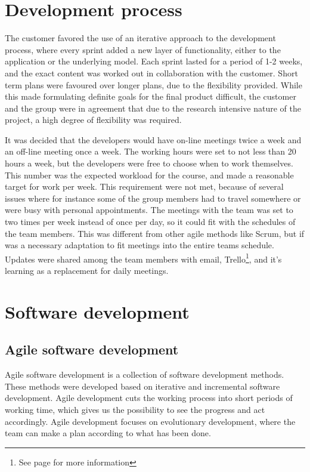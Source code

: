 \section{Development process}
\label{def:devProcess}

The customer favored the use of an iterative approach to the development process, where every sprint added a new layer of functionality, either to the application or the underlying model. Each sprint lasted for a period of 1-2 weeks, and the exact content was worked out in collaboration with the customer. Short term plans were favoured over longer plans, due to the flexibility provided. While this made formulating definite goals for the final product difficult, the customer and the group were in agreement that due to the research intensive nature of the project, a high degree of flexibility was required. 

It was decided that the developers would have on-line meetings twice a week and an off-line meeting once a week. 
The working hours were set to not less than 20 hours a week, but the developers were free to choose when to work themselves. This number was the expected workload for the course, and made a reasonable target for work per week. This requirement were not met, because of several issues where for instance some of the group members had to travel somewhere or were busy with personal appointments. The meetings with the team was set to two times per week instead of once per day, so it could fit with the schedules of the team members. This was different from other agile methods like Scrum, but if was a necessary adaptation to fit meetings into the entire teams schedule. Updates were shared among the team members with email, Trello\footnote{See page \pageref{def:trello} for more information}, and it's learning as a replacement for daily meetings.


\section{Software development}
\subsection{Agile software development}
Agile software development is a collection of software development methods. These methods were developed based on iterative and incremental software development. Agile development cuts the working process into short periods of working time, which gives us the possibility to see the progress and act accordingly. Agile development focuses on evolutionary development, where the team can make a plan according to what has been done.  

